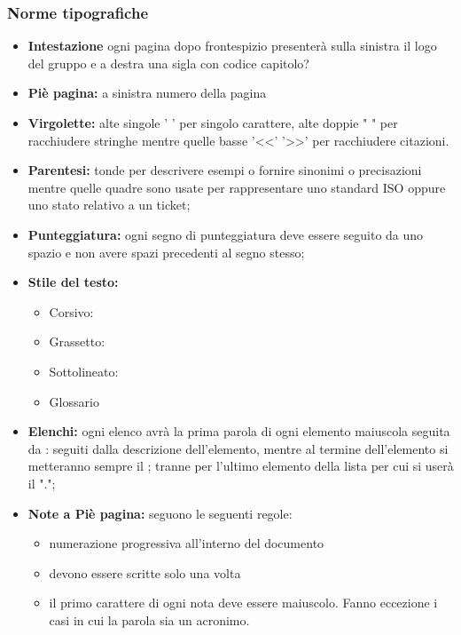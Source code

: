 \documentclass[NormeDiProgetto.tex]{subfiles}
\begin{document}
	\subsubsection{Norme tipografiche}
		\begin{itemize}
			\item \textbf{Intestazione} ogni pagina dopo frontespizio presenterà sulla sinistra il logo del gruppo e a destra una sigla con codice capitolo? %
			
			\item \textbf{Piè pagina:} a sinistra numero della pagina 
			
			\item \textbf{Virgolette:} alte singole ' ' per singolo carattere, alte doppie " " per racchiudere stringhe mentre quelle basse '<<' '>>' per racchiudere citazioni.
			 
			\item \textbf{Parentesi:} tonde per descrivere esempi o fornire sinonimi o precisazioni mentre quelle quadre sono usate per rappresentare uno standard ISO oppure uno stato relativo a un ticket;
			
			\item \textbf{Punteggiatura:} ogni segno di punteggiatura deve essere seguito da uno spazio e non avere spazi precedenti al segno stesso;

			\item \textbf{Stile del testo:} 
			\begin{itemize}
				\item Corsivo: %
				\item Grassetto:
				\item Sottolineato:
				\item Glossario %
			\end{itemize}
		
			\item \textbf{Elenchi:} ogni elenco avrà la prima parola di ogni elemento maiuscola seguita da : seguiti dalla descrizione dell'elemento, mentre al termine dell'elemento si metteranno sempre il ; tranne per l'ultimo elemento della lista per cui si userà il ".";
			 
			\item \textbf{Note a Piè pagina:} seguono le seguenti regole: 
			\begin{itemize}
				\item numerazione progressiva all'interno del documento
				\item devono essere scritte solo una volta
				\item il primo carattere di ogni nota deve essere maiuscolo. Fanno eccezione i casi in cui la parola sia un acronimo.
			\end{itemize}
			 

\end{itemize}
\end{document}
